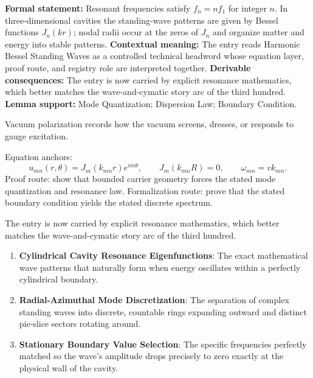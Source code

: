 \begingroup\footnotesize\setlength{\emergencystretch}{3em}\sloppy
\textbf{Formal statement:} Resonant frequencies satisfy \(f_n=n f_1\) for integer \(n\). In three-dimensional cavities the standing-wave patterns are given by Bessel functions \(J_n(kr)\); nodal radii occur at the zeros of \(J_n\) and organize matter and energy into stable patterns. \textbf{Contextual meaning:} The entry reads Harmonic Bessel Standing Waves as a controlled technical headword whose equation layer, proof route, and registry role are interpreted together. \textbf{Derivable consequences:} The entry is now carried by explicit resonance mathematics, which better matches the wave-and-cymatic story arc of the third hundred. \textbf{Lemma support:} Mode Quantization; Dispersion Law; Boundary Condition.\par
\endgroup

Vacuum polarization records how the vacuum screens, dresses, or responds to gauge excitation.

Equation anchors:
\[
u_{mn}(r,\theta)=J_m(k_{mn}r)e^{im\theta},\qquad
J_m(k_{mn}R)=0,\qquad
\omega_{mn}=v k_{mn}.
\]
Proof route: show that bounded carrier geometry forces the stated mode quantization and resonance law. Formalization route: prove that the stated boundary condition yields the stated discrete spectrum.

The entry is now carried by explicit resonance mathematics, which better matches the wave-and-cymatic story arc of the third hundred.
\endgroup

\begin{enumerate}[leftmargin=1.6em,itemsep=6pt,topsep=4pt]
\item \textbf{Cylindrical Cavity Resonance Eigenfunctions}: The exact mathematical wave patterns that naturally form when energy oscillates within a perfectly cylindrical boundary.
\item \textbf{Radial-Azimuthal Mode Discretization}: The separation of complex standing waves into discrete, countable rings expanding outward and distinct pie-slice sectors rotating around.
\item \textbf{Stationary Boundary Value Selection}: The specific frequencies perfectly matched so the wave's amplitude drops precisely to zero exactly at the physical wall of the cavity.
\end{enumerate}


